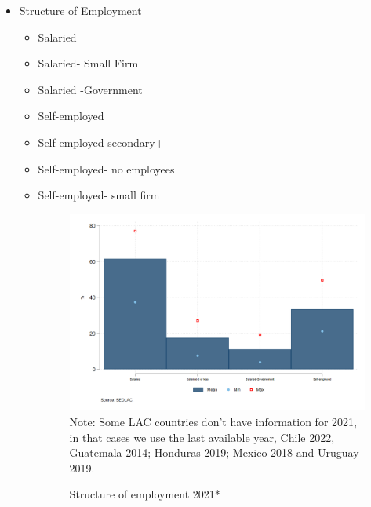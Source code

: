 \documentclass[english]{article}
\begin{document}
\begin{itemize}
\begin{itemize}
    \end{itemize}
    \item Structure of Employment
    
    \begin{itemize}
        \item Salaried
        \item Salaried- Small Firm
        \item Salaried -Government
        \item Self-employed 
        \item Self-employed secondary+
        \item Self-employed- no employees
        \item Self-employed- small firm
        \begin{figure}[!htb]
        \centering
        \caption{Structure of employment 2021*}     
        \includegraphics[scale=.3]{latex/figures/Snapshot/Structure of employment.png}
        \label{fig:employment}
        \footnotesize{Note: Some LAC countries don’t have information for 2021, in that cases we use the last available year, Chile 2022, Guatemala 2014; Honduras 2019; Mexico 2018 and Uruguay 2019.}
        \end{figure}


\end{itemize}
\end{itemize}
\end{document}
